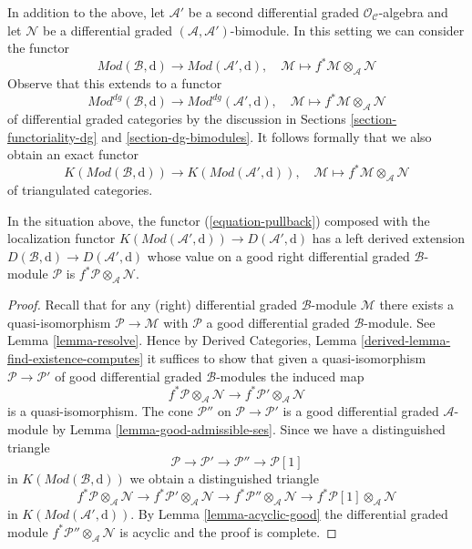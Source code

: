 \medskip\noindent
In addition to the above, let $\mathcal{A}'$ be a second differential
graded $\mathcal{O}_\mathcal{C}$-algebra and let $\mathcal{N}$
be a differential graded $(\mathcal{A}, \mathcal{A}')$-bimodule.
In this setting we can consider the functor
$$
\textit{Mod}(\mathcal{B}, \text{d})
\longrightarrow
\textit{Mod}(\mathcal{A}', \text{d}),\quad
\mathcal{M} \longmapsto f^*\mathcal{M} \otimes_{\mathcal{A}} \mathcal{N}
$$
Observe that this extends to a functor
$$
\textit{Mod}^{dg}(\mathcal{B}, \text{d})
\longrightarrow
\textit{Mod}^{dg}(\mathcal{A}', \text{d}),\quad
\mathcal{M} \longmapsto f^*\mathcal{M} \otimes_{\mathcal{A}} \mathcal{N}
$$
of differential graded categories by the discussion in
Sections \ref{section-functoriality-dg} and \ref{section-dg-bimodules}.
It follows formally that we also obtain an exact functor
\begin{equation}
\label{equation-pullback}
K(\textit{Mod}(\mathcal{B}, \text{d}))
\longrightarrow
K(\textit{Mod}(\mathcal{A}', \text{d})),\quad
\mathcal{M} \longmapsto f^*\mathcal{M} \otimes_{\mathcal{A}} \mathcal{N}
\end{equation}
of triangulated categories.

\begin{lemma}
\label{lemma-derived-tensor-product}
In the situation above, the functor (\ref{equation-pullback})
composed with the localization functor
$K(\textit{Mod}(\mathcal{A}', \text{d})) \to D(\mathcal{A}', \text{d})$
has a left derived extension
$D(\mathcal{B}, \text{d}) \to D(\mathcal{A}', \text{d})$ whose
value on a good right differential graded $\mathcal{B}$-module
$\mathcal{P}$ is $f^*\mathcal{P} \otimes_\mathcal{A} \mathcal{N}$.
\end{lemma}

\begin{proof}
Recall that for any (right) differential graded $\mathcal{B}$-module
$\mathcal{M}$ there exists a quasi-isomorphism $\mathcal{P} \to \mathcal{M}$
with $\mathcal{P}$ a good differential graded $\mathcal{B}$-module.
See Lemma \ref{lemma-resolve}.
Hence by Derived Categories, Lemma \ref{derived-lemma-find-existence-computes}
it suffices to show that given a quasi-isomorphism
$\mathcal{P} \to \mathcal{P}'$ of good differential graded
$\mathcal{B}$-modules the induced map
$$
f^*\mathcal{P} \otimes_\mathcal{A} \mathcal{N}
\longrightarrow
f^*\mathcal{P}' \otimes_\mathcal{A} \mathcal{N}
$$
is a quasi-isomorphism. The cone $\mathcal{P}''$ on
$\mathcal{P} \to \mathcal{P}'$ is a good differential graded
$\mathcal{A}$-module by Lemma \ref{lemma-good-admissible-ses}.
Since we have a distinguished triangle
$$
\mathcal{P} \to \mathcal{P}' \to \mathcal{P}'' \to \mathcal{P}[1]
$$
in $K(\textit{Mod}(\mathcal{B}, \text{d}))$ we obtain a distinguished
triangle
$$
f^*\mathcal{P} \otimes_\mathcal{A} \mathcal{N} \to
f^*\mathcal{P}' \otimes_\mathcal{A} \mathcal{N} \to
f^*\mathcal{P}'' \otimes_\mathcal{A} \mathcal{N} \to
f^*\mathcal{P}[1] \otimes_\mathcal{A} \mathcal{N}
$$
in $K(\textit{Mod}(\mathcal{A}', \text{d}))$. By
Lemma \ref{lemma-acyclic-good}
the differential graded module
$f^*\mathcal{P}'' \otimes_\mathcal{A} \mathcal{N}$
is acyclic and the proof is complete.
\end{proof}

